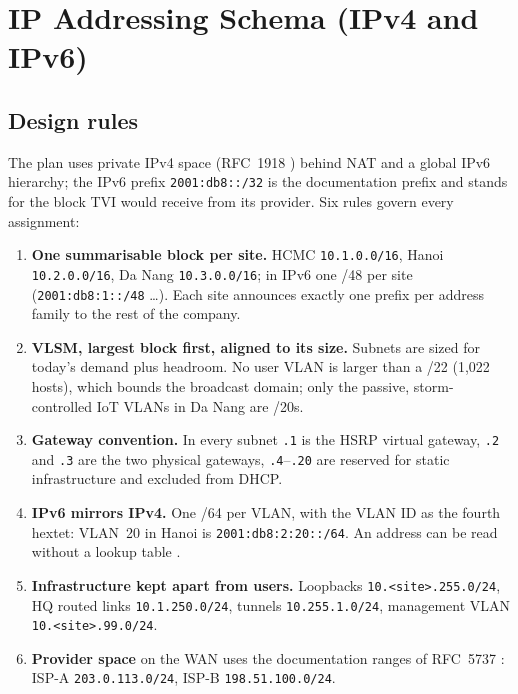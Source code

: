 \section{IP Addressing Schema (IPv4 and IPv6)}\label{sec:ip}

\subsection{Design rules}\label{sec:ip-rules}
The plan uses private IPv4 space (RFC~1918 \cite{rfc1918}) behind NAT and a global IPv6 hierarchy; the
IPv6 prefix \texttt{2001:db8::/32} is the documentation prefix \cite{rfc3849} and stands for the block TVI
would receive from its provider. Six rules govern every assignment:

\begin{enumerate}
  \item \textbf{One summarisable block per site.} HCMC \texttt{10.1.0.0/16}, Hanoi \texttt{10.2.0.0/16},
        Da Nang \texttt{10.3.0.0/16}; in IPv6 one /48 per site (\texttt{2001:db8:1::/48} \ldots).
        Each site announces exactly one prefix per address family to the rest of the company.
  \item \textbf{VLSM, largest block first, aligned to its size.} Subnets are sized for today's demand plus
        headroom. No user VLAN is larger than a /22 (1{,}022 hosts), which bounds the broadcast domain; only
        the passive, storm-controlled IoT VLANs in Da Nang are /20s.
  \item \textbf{Gateway convention.} In every subnet \texttt{.1} is the HSRP virtual gateway, \texttt{.2} and
        \texttt{.3} are the two physical gateways, \texttt{.4}--\texttt{.20} are reserved for static
        infrastructure and excluded from DHCP.
  \item \textbf{IPv6 mirrors IPv4.} One /64 per VLAN, with the VLAN ID as the fourth hextet: VLAN~20 in Hanoi
        is \texttt{2001:db8:2:20::/64}. An address can be read without a lookup table \cite{rfc4291}.
  \item \textbf{Infrastructure kept apart from users.} Loopbacks \texttt{10.<site>.255.0/24}, HQ routed links
        \texttt{10.1.250.0/24}, tunnels \texttt{10.255.1.0/24}, management VLAN \texttt{10.<site>.99.0/24}.
  \item \textbf{Provider space} on the WAN uses the documentation ranges of RFC~5737 \cite{rfc5737}:
        ISP-A \texttt{203.0.113.0/24}, ISP-B \texttt{198.51.100.0/24}.
\end{enumerate}

